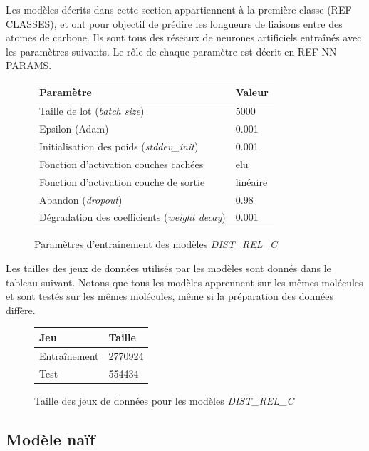 \par Les modèles décrits dans cette section appartiennent à la première classe (REF CLASSES), et ont pour objectif de prédire les longueurs de liaisons entre des atomes de carbone. Ils sont tous des réseaux de neurones artificiels entraînés avec les paramètres suivants. Le rôle de chaque paramètre est décrit en REF NN PARAMS.

\begin{figure}[!h]
	\centering
	\begin{tabular}{|l|l|}
		\hline
		\textbf{Paramètre} & \textbf{Valeur} \\ \hline
		Taille de lot (\emph{batch size}) & 5000 \\ \hline
		Epsilon (Adam) & 0.001 \\ \hline
		Initialisation des poids (\emph{stddev\_init}) & 0.001 \\ \hline
		Fonction d'activation couches cachées & elu \\ \hline
		Fonction d'activation couche de sortie & linéaire \\ \hline
		Abandon (\emph{dropout}) & 0.98 \\ \hline
		Dégradation des coefficients (\emph{weight decay}) & 0.001 \\ \hline
	\end{tabular}

	\caption{Paramètres d'entraînement des modèles \emph{DIST\_REL\_C}}
\end{figure}

\par Les tailles des jeux de données utilisés par les modèles sont donnés dans le tableau suivant. Notons que tous les modèles apprennent sur les mêmes molécules et sont testés sur les mêmes molécules, même si la préparation des données diffère.

\begin{figure}[!h]
	\centering
	\begin{tabular}{|l|l|}
		\hline
		\textbf{Jeu} & \textbf{Taille} \\ \hline
		Entraînement & 2770924 \\ \hline
		Test & 554434 \\ \hline
	\end{tabular}
	\caption{Taille des jeux de données pour les modèles \emph{DIST\_REL\_C}}
\end{figure}


\subsection{Modèle naïf}

